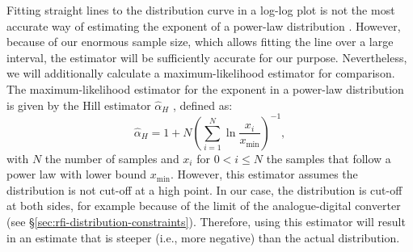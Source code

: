 \documentclass[useAMS,usenatbib]{mn2e}
\begin{document}
Fitting straight lines to the distribution curve in a log-log plot is not the most accurate way of estimating the exponent of a power-law distribution \citep{power-law-distribution}. However, because of our enormous sample size, which allows fitting the line over a large interval, the estimator will be sufficiently accurate for our purpose. Nevertheless, we will additionally calculate a maximum-likelihood estimator for comparison. The maximum-likelihood estimator for the exponent in a power-law distribution is given by the Hill estimator $\hat \alpha_H$ \citep{hill-estimator, power-law-distribution}, defined as:
\begin{equation} \label{eq:hill}
 \hat \alpha_H = 1 + N \left(\sum\limits_{i=1}^{N} \ln \frac{x_i}{x_\textrm{min}} \right)^{-1},
\end{equation}
with $N$ the number of samples and $x_i$ for $0 < i \le N$ the samples that follow a power law with lower bound $x_\textrm{min}$.
However, this estimator assumes the distribution is not cut-off at a high point. In our case, the distribution is cut-off at both sides, for example because of the limit of the analogue-digital converter (see \S\ref{sec:rfi-distribution-constraints}). Therefore, using this estimator will result in an estimate that is steeper (i.e., more negative) than the actual distribution.
\end{document}

